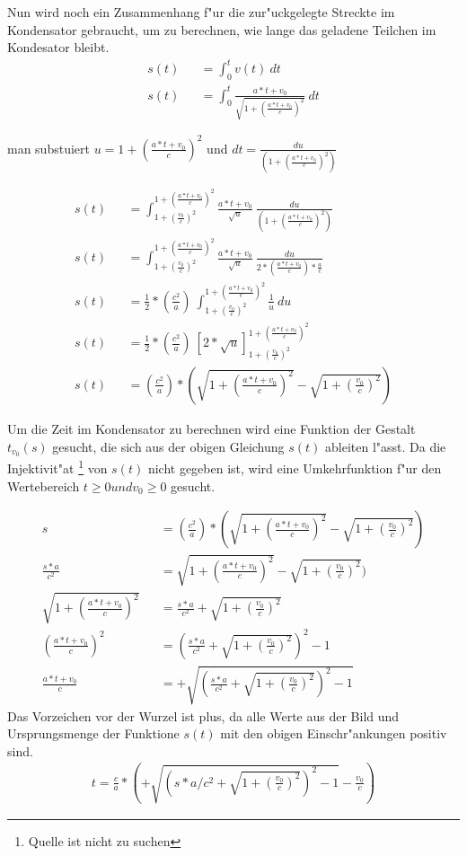\documentclass[14pt, a4paper]{report}
\begin{document}
\newpage
Nun wird noch ein Zusammenhang f"ur die zur"uckgelegte Streckte im Kondensator gebraucht,
um zu berechnen, wie lange das geladene Teilchen im Kondesator bleibt.
\begin{eqnarray}
s(t) && = \int_0^t v(t) ~dt \\
s(t) && = \int_0^t \frac{a * t + v_0}{\sqrt{1 + (\frac{a * t + v_0}{c})^2}} ~ dt
\end{eqnarray}

man substuiert $u = 1 + (\frac{a * t + v_0}{c})^2$ und 
$dt = \frac{du}{(1 + (\frac{a * t + v_0}{c})^2)\dot{}}$

\begin{eqnarray}
s(t) && = \int_{1 + (\frac{v_0}{c})^2}^{1 + (\frac{a*t + v_0}{c})^2}  \frac{a * t + v_0}{\sqrt{u}} ~ \frac{du}{ ({1 + (\frac{a * t + v_0}{c})^2})\dot{}}\\
s(t) && =  \int_{1 + (\frac{v_0}{c})^2}^{1 + (\frac{a*t + v_0}{c})^2}  \frac{a * t + v_0}{\sqrt{u}} ~ \frac{du}{2*(\frac{a * t + v_0}{c})*\frac{a}{c}}\\
s(t) && = \frac{1}{2}*(\frac{c^2}{a}) ~ \int_{1 + (\frac{v_0}{c})^2}^{1 + (\frac{a*t + v_0}{c})^2} \frac{1}{u} ~ du \\
s(t) && = \frac{1}{2}*(\frac{c^2}{a})~[2*\sqrt{u}]_{1 + (\frac{v_0}{c})^2}^{1 + (\frac{a*t + v_0}{c})^2} \\
s(t) && = (\frac{c^2}{a}) * (\sqrt{1 + (\frac{a*t + v_0}{c})^2} - \sqrt{1 + (\frac{v_0}{c})^2})
\end{eqnarray}

Um die Zeit im Kondensator zu berechnen wird eine Funktion der Gestalt $t_{v_0}(s)$
gesucht, die sich aus der obigen Gleichung $s(t)$ ableiten l"asst. Da die Injektivit"at 
\footnote{Quelle ist nicht zu suchen} von $s(t)$ nicht gegeben ist, wird eine 
Umkehrfunktion f"ur den Wertebereich $t \ge 0 und v_0 \ge 0$ gesucht.

\begin{eqnarray}
s && = (\frac{c^2}{a}) * (\sqrt{1 + (\frac{a*t + v_0}{c})^2} - \sqrt{1 + (\frac{v_0}{c})^2}) \\
\frac{s*a}{c^2}&& = \sqrt{1 + (\frac{a*t + v_0}{c})^2} - \sqrt{1 + (\frac{v_0}{c})^2}) \\
\sqrt{1 + (\frac{a*t + v_0}{c})^2} &&= \frac{s*a}{c^2} + \sqrt{1 + (\frac{v_0}{c})^2} \\
(\frac{a*t + v_0}{c})^2 &&  = (\frac{s*a}{c^2} + \sqrt{1 + (\frac{v_0}{c})^2})^2 - 1 \\ 
\frac{a*t + v_0}{c} && = +\sqrt{(\frac{s*a}{c^2} + \sqrt{1 + (\frac{v_0}{c})^2})^2 - 1}
\end{eqnarray}
Das Vorzeichen vor der Wurzel ist plus, da alle Werte aus der Bild und Ursprungsmenge 
der Funktione $s(t)$ mit den obigen Einschr"ankungen positiv sind.
\begin{eqnarray}
t = \frac{c}{a} * ( +\sqrt{(s*a/c^2 + \sqrt{1 + (\frac{v_0}{c})^2})^2 - 1} - \frac{v_0}{c})
\end{eqnarray}
\end{document}
